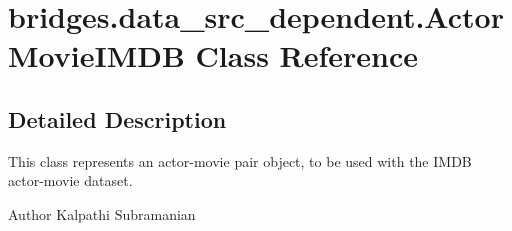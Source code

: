 \hypertarget{classbridges_1_1data__src__dependent_1_1_actor_movie_i_m_d_b}{}\section{bridges.\+data\+\_\+src\+\_\+dependent.\+Actor\+Movie\+I\+M\+DB Class Reference}
\label{classbridges_1_1data__src__dependent_1_1_actor_movie_i_m_d_b}


\subsection{Detailed Description}
This class represents an actor-\/movie pair object, to be used with the I\+M\+DB actor-\/movie dataset. 

\begin{DoxyAuthor}{Author}
Kalpathi Subramanian 
\end{DoxyAuthor}
